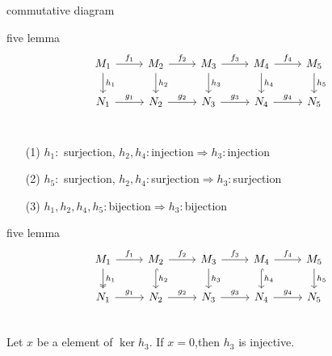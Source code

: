 \documentclass[unicode]{beamer}
\begin{document}
	\begin{frame}[fragile]{commutative diagram}%
		\begin{block}{five lemma}
			\[ 
				\begin{tikzcd}
					M_1 \arrow[r,"f_1"]\arrow[d,"h_1"] & M_2 \arrow[r,"f_2"]\arrow[d,"h_2"] & M_3 \arrow[r,"f_3"]\arrow[d,"h_3"] & M_4\arrow[r,"f_4"]\arrow[d,"h_4"] & M_5 \arrow[d,"h_5"]\\
					N_1 \arrow[r,"g_1"] & N_2 \arrow[r,"g_2"] & N_3 \arrow[r,"g_3"] & N_4\arrow[r,"g_4"] & N_5 \\
				\end{tikzcd}
		\]
		\vspace{-35pt}
		\begin{enumerate}
			\item[(1)]
				$h_1\colon$ surjection, $h_2,h_4\colon$injection$\Longrightarrow h_3\colon $injection
			\item[(2)]
				$h_5\colon$ surjection, $h_2,h_4\colon$surjection$\Longrightarrow h_3\colon $surjection
			\item[(3)]
				 $h_1,h_2,h_4,h_5\colon$bijection$\Longrightarrow h_3\colon $bijection
		\end{enumerate}
		\end{block}
	\end{frame}
	\begin{frame}[fragile]{five lemma}
			\[ 
				\begin{tikzcd}
					M_1 \arrow[r,"f_1"]\arrow[d,two heads,"h_1"] & M_2 \arrow[r,"f_2"]\arrow[d,hook,"h_2"] & M_3 \arrow[r,"f_3"]\arrow[d,"h_3"] & M_4\arrow[r,"f_4"]\arrow[d,hook,"h_4"] & M_5 \arrow[d,"h_5"]\\
					N_1 \arrow[r,"g_1"] & N_2 \arrow[r,"g_2"] & N_3 \arrow[r,"g_3"] & N_4\arrow[r,"g_4"] & N_5 \\
				\end{tikzcd}
		\]
		Let $x$ be a element of $\ker h_3$. If $x=0$,then $h_3$ is injective.
	\end{frame}
\end{document}
